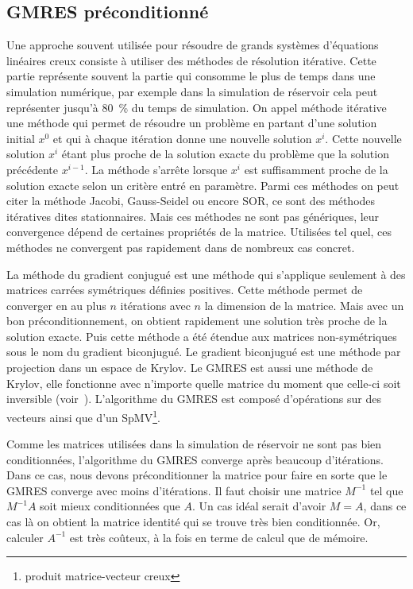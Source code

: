 \subsection{GMRES préconditionné}
Une approche souvent utilisée pour résoudre de grands systèmes d'équations linéaires creux consiste à utiliser des méthodes de résolution itérative.
%
Cette partie représente souvent la partie qui consomme le plus de temps dans une simulation numérique, par exemple dans la simulation de réservoir cela peut représenter jusqu'à 80~\% du temps de simulation.
%
On appel méthode itérative une méthode qui permet de résoudre un problème en partant d'une solution initial $x^0$ et qui à chaque itération donne une nouvelle solution $x^i$.
%
Cette nouvelle solution $x^i$ étant plus proche de la solution exacte du problème que la solution précédente $x^{i-1}$.
%
La méthode s'arrête lorsque $x^i$ est suffisamment proche de la solution exacte selon un critère entré en paramètre.
%
Parmi ces méthodes on peut citer la méthode Jacobi, Gauss-Seidel ou encore SOR, ce sont des méthodes itératives dites stationnaires.
%
Mais ces méthodes ne sont pas génériques, leur convergence dépend de certaines propriétés de la matrice.
%
Utilisées tel quel, ces méthodes ne convergent pas rapidement dans de nombreux cas concret.


La méthode du gradient conjugué est une méthode qui s'applique seulement à des matrices carrées symétriques définies positives.
%
Cette méthode permet de converger en au plus $n$ itérations avec $n$ la dimension de la matrice.
%
Mais avec un bon préconditionnement, on obtient rapidement une solution très proche de la solution exacte.
%
Puis cette méthode a été étendue aux matrices non-symétriques sous le nom du gradient biconjugué.
%
Le gradient biconjugué est une méthode par projection dans un espace de Krylov.
%
Le GMRES est aussi une méthode de Krylov, elle fonctionne avec n'importe quelle matrice du moment que celle-ci soit inversible (voir~\cite{Saad96IMSLS}).
%
L'algorithme du GMRES est composé d'opérations sur des vecteurs ainsi que d'un SpMV\footnote{produit matrice-vecteur creux}.

Comme les matrices utilisées dans la simulation de réservoir ne sont pas bien conditionnées, l'algorithme du GMRES converge après beaucoup d'itérations.
%
Dans ce cas, nous devons préconditionner la matrice pour faire en sorte que le GMRES converge avec moins d'itérations.
%
Il faut choisir une matrice $M^{-1}$ tel que $M^{-1}A$ soit mieux conditionnées que $A$.
%
Un cas idéal serait d'avoir $M=A$, dans ce cas là on obtient la matrice identité qui se trouve très bien conditionnée.
%
Or, calculer $A^{-1}$ est très coûteux, à la fois en terme de calcul que de mémoire.

